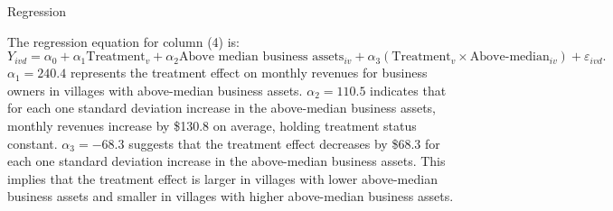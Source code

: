 \begin{homeworkProblem}{Regression}
\begin{solution}
\begin{itemize}
                The regression equation for column (4) is:
                \[
                    Y_{ivd} = \alpha_0 + \alpha_1 \text{Treatment}_{v} + 
                    \alpha_2 \text{Above median business assets}_{iv} +
                    \alpha_3 \left( \text{Treatment}_{v} \times 
                    \text{Above-median}_{iv} \right) + 
                    \varepsilon_{ivd}.
                \]
                $\alpha_1 = 240.4$ represents the treatment effect on
                monthly revenues for business owners in villages with above-median
                business assets. $\alpha_2 = 110.5$ indicates that for each one
                standard deviation increase in the above-median business assets,
                monthly revenues increase by \$130.8 on average, holding treatment
                status constant. $\alpha_3 = -68.3$ suggests that the treatment
                effect decreases by \$68.3 for each one standard deviation increase
                in the above-median business assets. This implies that the treatment
                effect is larger in villages with lower above-median business assets
                and smaller in villages with higher above-median business assets.

        \end{itemize}

    \end{solution}

\end{homeworkProblem}